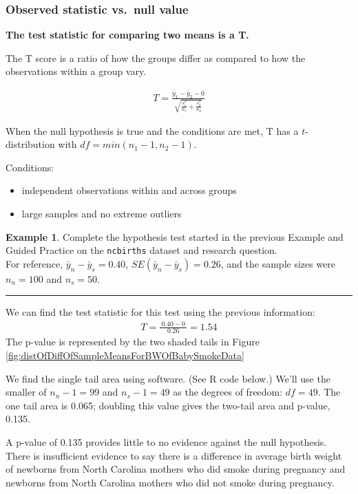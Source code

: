 \documentclass[
  10pt,
  openany]{book}
\providecommand{\tightlist}{%
  \setlength{\itemsep}{0pt}\setlength{\parskip}{0pt}}
\theoremstyle{definition}
\theoremstyle{definition}
\newtheorem{example}{Example}[chapter]
\theoremstyle{definition}
\theoremstyle{definition}
\theoremstyle{remark}
\begin{document}
\subsubsection*{Observed statistic vs.~null value}\label{observed-statistic-vs.-null-value-2}

\textbf{The test statistic for comparing two means is a T.}

The T score is a ratio of how the groups differ as compared to how the observations within a group vary.

\begin{align*}
T = \frac{\bar{y}_1 - \bar{y}_2 - 0}{\sqrt{\frac{s_1^2}{n_1} + \frac{s_2^2}{n_2}}}
\end{align*}

When the null hypothesis is true and the conditions are met, T has a \(t\)-distribution with \(df = min(n_1 - 1, n_2 -1)\).

Conditions:

\begin{itemize}
\tightlist
\item
  independent observations within and across groups\\
\item
  large samples and no extreme outliers\\
\end{itemize}

\begin{example}
Complete the hypothesis test started in the previous Example and Guided Practice on the \texttt{ncbirths} dataset and research question.\\
For reference, \(\bar{y}_{n} - \bar{y}_{s} = 0.40\),
\(SE(\bar{y}_{n} - \bar{y}_{s}) = 0.26\), and the sample sizes were \(n_n = 100\) and \(n_s = 50\).

\begin{center}\rule{0.5\linewidth}{0.5pt}\end{center}

We can find the test statistic for this test
using the previous information:
\begin{align*}
  T = \frac{\ 0.40 - 0\ }{0.26} = 1.54
  \end{align*}
The p-value is represented by the two shaded tails
in Figure \ref{fig:distOfDiffOfSampleMeansForBWOfBabySmokeData}

We find the single tail area using software. (See R code below.) We'll use the
smaller of \(n_n - 1 = 99\) and \(n_s - 1 = 49\) as the
degrees of freedom: \(df = 49\).
The one tail area is 0.065;
doubling this value gives the two-tail area and p-value,
0.135.

A p-value of 0.135 provides little to no evidence against the null hypothesis.
There is insufficient evidence to say there is a difference
in average birth weight of newborns from North Carolina mothers
who did smoke during pregnancy and newborns from North Carolina
mothers who did not smoke during pregnancy.
\end{example}
\end{document}
